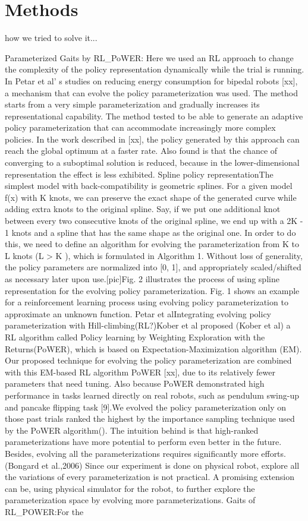 \section{Methods}

how we tried to solve it...

Parameterized Gaits by RL\_PoWER: Here we used an RL approach to change the complexity of the policy representation dynamically while the trial is running. In Petar et al’ s studies on reducing energy consumption for bipedal robots [xx], a mechanism that can evolve the policy parameterization was used. The method starts from a very simple parameterization and gradually increases its representational capability. The method tested to be able to generate an adaptive policy parameterization that can accommodate increasingly more complex policies. In the work described in [xx], the policy generated by this approach can reach the global optimum at a faster rate. Also found is that the chance of converging to a suboptimal solution is reduced, because in the lower-dimensional representation the effect is less exhibited. Spline policy representationThe simplest model with back-compatibility is geometric splines. For a given model f(x) with K knots, we can preserve the exact shape of the generated curve while adding extra knots to the original spline. Say, if we put one additional knot between every two consecutive knots of the original spline, we end up with a 2K - 1 knots and a spline that has the same shape as the original one. In order to do this, we need to define an algorithm for evolving the parameterization from K to L knots (L > K ), which is formulated in Algorithm 1.  Without loss of generality, the policy parameters are normalized into [0, 1], and appropriately scaled/shifted as necessary later upon use.[pic]Fig. 2 illustrates the process of using spline representation for the evolving policy parameterization. Fig. 1 shows an example for a reinforcement learning process using evolving policy parameterization to approximate an unknown function. Petar et alIntegrating evolving policy parameterization with Hill-climbing(RL?)Kober et al  proposed (Kober et al) a RL algorithm called Policy learning by Weighting Exploration with the Returns(PoWER), which is based on Expectation-Maximization  algorithm (EM). Our proposed technique for evolving the policy parameterization are combined with this EM-based RL algorithm PoWER [xx], due to its relatively fewer parameters that need tuning. Also because PoWER demonstrated high performance in tasks learned directly on real robots, such as pendulum swing-up and pancake flipping task [9].We evolved the policy parameterization only on those past trials ranked the highest by the importance sampling technique used by the PoWER algorithm(). The intuition behind is that high-ranked parameterizations have more potential to perform even better in the future. Besides, evolving all the parameterizations requires significantly more efforts. (Bongard et al.,2006) Since our experiment is done on physical robot, explore all the variations of every parameterization is not practical. A promising extension can be, using physical simulator for the robot, to further explore the parameterization space by evolving more parameterizations. Gaits of RL\_POWER:For the 